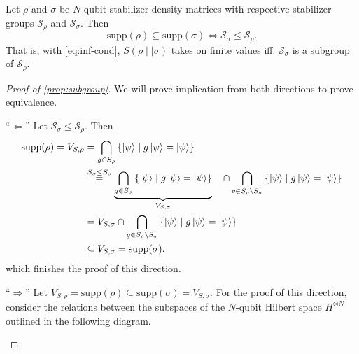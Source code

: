 \begin{thm}\label{prop:subgroup}
  Let $\rho$ and $\sigma$ be $N$-qubit stabilizer density matrices with
  respective stabilizer groups $\mathcal{S}_\rho$ and $\mathcal{S}_\sigma$. Then
  \[ \mathrm{supp}(\rho)\subseteq \mathrm{supp}(\sigma) \Longleftrightarrow
  \mathcal{S}_\sigma \leq \mathcal{S}_\rho. \]
  That is, with \cref{eq:inf-cond}, $S(\rho\mid\mid\sigma)$ takes on finite
  values iff. $\mathcal{S}_\sigma$ is a
  subgroup of $\mathcal{S}_\rho$.
\end{thm}

\begin{proof}[Proof of \cref{prop:subgroup}]
  We will prove implication from both directions to prove equivalence.

  \enquote{$\Leftarrow$} Let $\mathcal{S}_\sigma \leq \mathcal{S}_\rho$. Then
  \begin{align*}
    \mathrm{supp}(\rho) = V_{S,\rho} &= \bigcap_{g\in S_\rho} \left\{ \ket{\psi} \mid
    g\ket{\psi} = \ket{\psi} \right\} \\
        &\overset{S_\sigma \leq S_\rho}{=} \underbrace{\bigcap_{g\in S_\sigma}
        \left\{\ket{\psi} \mid g \ket{\psi} =
        \ket{\psi}\right\}}_{V_{S,\sigma}}\ \ \ \cap \bigcap_{g \in S_\rho \setminus
        S_\sigma} \left\{\ket{\psi} \mid g \ket{\psi} =
        \ket{\psi}\right\}\\
        &= V_{S,\sigma} \cap \bigcap_{g \in S_\rho \setminus
        S_\sigma} \left\{\ket{\psi} \mid g \ket{\psi} =
        \ket{\psi}\right\}\\
        &\subseteq V_{S,\sigma} = \mathrm{supp}(\sigma)
  .\end{align*}
  which finishes the proof of this direction.

  \enquote{$\Rightarrow$} Let $V_{S,\rho} = \mathrm{supp}(\rho) \subseteq
  \mathrm{supp}(\sigma) = V_{S,\sigma}$. 
  For the proof of this direction, consider the relations between the subspaces
  of the $N$-qubit Hilbert space $H^{\otimes N}$ outlined in the following
  diagram.
  \begin{figure}[H]
    \centering
\end{figure}


\end{proof}
